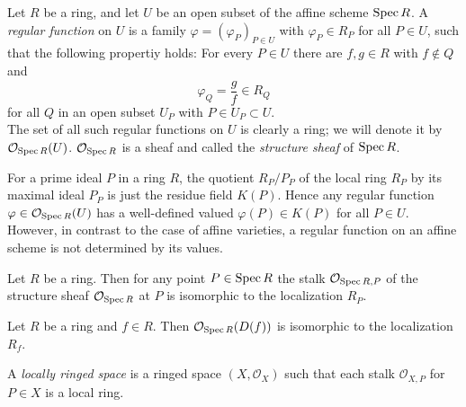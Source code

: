 \begin{definition}
  Let $R$ be a ring, and let $U$ be an open subset of the affine scheme $\operatorname{Spec} R$. A \textit{regular function} on $U$ is a family $\varphi=\left( \varphi_P \right) _{P \in U}$ with $\varphi_P \in R_P$ for all $P \in U$, such that the following propertiy holds: For every $P \in U$ there are $f,g \in R$ with $f\notin Q$ and 
  \[
  \varphi_Q=\frac{g}{f}\in R_Q
  \] for all $Q$ in an open subset $U_P$ with $P\in U_P\subset U$.\\
  The set of all such regular functions on $U$ is clearly a ring; we will denote it by $\mathcal{O}_{\operatorname{Spec} R}(U)$. $\mathcal{O}_{\operatorname{Spec} R}$ is a sheaf and called the \textit{structure sheaf} of $\operatorname{Spec} R$.
\end{definition}

\begin{remark}
  For a prime ideal $P$ in a ring $R$, the quotient $R_P /P_P$ of the local ring $R_P$ by its maximal ideal $P_P$ is just the residue field  $K(P)$. Hence any regular function $\varphi \in \mathcal{O}_{\operatorname{Spec} R}(U)$ has a well-defined valued $\varphi(P) \in K(P)$ for all $P\in U$. However, in contrast to the case of affine varieties, a regular function on an affine scheme is not determined by its values.
\end{remark}

\begin{lemma}
  Let $R$ be a ring. Then for any point $P\in \operatorname{Spec} R$ the stalk $\mathcal{O}_{\operatorname{Spec} R,P}$ of the structure sheaf $\mathcal{O}_{\operatorname{Spec} R}$ at $P$ is isomorphic to the localization $R_P$.
\end{lemma}

\begin{proposition}
  Let $R$ be a ring and $f\in R$. Then $\mathcal{O}_{\operatorname{Spec} R}(D(f))$ is isomorphic to the localization $R_f$.
\end{proposition}

\begin{definition}
  A \textit{locally ringed space} is a ringed space $(X,\mathcal{O}_X)$ such that each stalk $\mathcal{O}_{X,P}$ for $P\in X$ is a local ring.
\end{definition}

